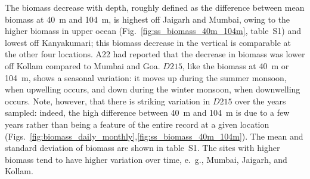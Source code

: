 \documentclass[authoryear,review,11pt]{elsarticle}
\begin{document}
The biomass decrease with depth, roughly defined as the difference between mean biomass at 40~m and 104~m, is highest off Jaigarh and Mumbai, owing to the higher biomass in upper ocean (Fig.~\ref{fig:ss_biomass_40m_104m}, table~S1) and lowest off Kanyakumari; this biomass decrease in the vertical is comparable at the other four locations. A22 had reported that the decrease in biomass was lower off Kollam compared to Mumbai and Goa. $D215$, like the biomass at 40~m or 104~m, shows a seasonal variation: it moves up during the summer monsoon, when upwelling occurs, and down during the winter monsoon, when downwelling occurs.  Note, however, that there is striking variation in $D215$ over the years sampled: indeed, the high difference between 40~m and 104~m is due to a few years rather than being a feature of the entire record at a given location (Figs.~\ref{fig:biomass_daily_monthly},\ref{fig:ss_biomass_40m_104m}). The mean and standard deviation of biomass are shown in table~S1. The sites with higher biomass tend to have higher variation over time, e.~g., Mumbai, Jaigarh, and Kollam.

\end{document}
